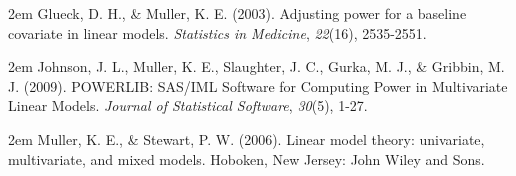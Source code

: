 \documentclass{glimmpse-report}
\begin{document}
\hangindent2em
 Glueck, D. H., \& Muller, K. E. (2003). Adjusting power for a baseline covariate in linear models. \emph{Statistics in Medicine}, \emph{22}(16), 2535-2551.

\hangindent2em
 Johnson, J. L., Muller, K. E., Slaughter, J. C., Gurka, M. J., \& Gribbin, M. J. (2009). POWERLIB: SAS/IML Software for Computing Power in Multivariate Linear Models. \emph{Journal of Statistical Software}, \emph{30}(5), 1-27.

\hangindent2em
 Muller, K. E., \& Stewart, P. W. (2006). Linear model theory: univariate, multivariate, and mixed models. Hoboken, New Jersey: John Wiley and Sons.
\end{document}
